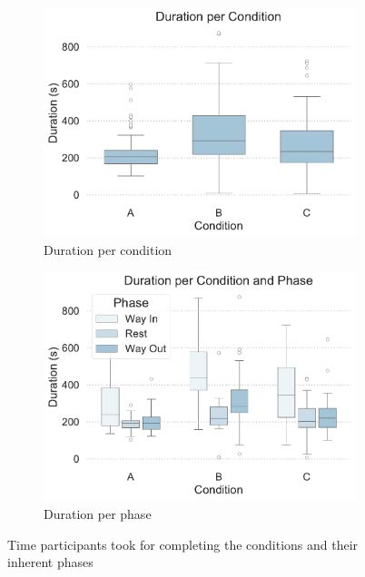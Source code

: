 \begin{figure}[htb]
	\centering
	\begin{subfigure}[t]{0.49\columnwidth}
		\centering
		\includegraphics[width=\textwidth]{include/images/duration_per_condition.pdf}
		\caption{Duration per condition}
		\label{fig:duration-condition}
	\end{subfigure}
	\hspace*{\fill}
	\begin{subfigure}[t]{0.49\columnwidth}
		\centering
		\includegraphics[width=\textwidth]{include/images/duration_per_phase.pdf}
		\caption{Duration per phase}
		\label{fig:duration-phase}
	\end{subfigure}
	\captionsetup{subrefformat=parens}
	\caption[Results: duration]{Time participants took for completing the conditions and their inherent phases}
	\label{fig:duration}
\end{figure}